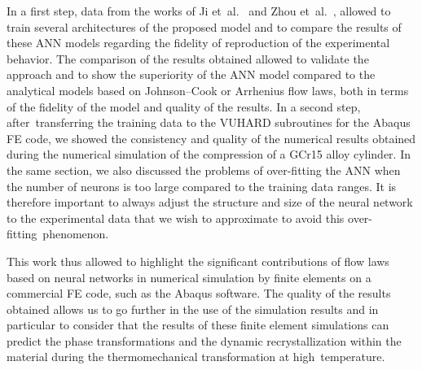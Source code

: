 \documentclass[algorithms,article,accept,pdftex,oneauthors]{Definitions/mdpi}
\begin{document}
In a first step, data from the works of Ji et~al.~\cite{Ji-2018} and Zhou et~al.~\cite{Zhou-2020}, allowed to train several architectures of the proposed model and to compare the results of these ANN models regarding the fidelity of reproduction of the experimental behavior.
The comparison of the results obtained allowed to validate the approach and to show the superiority of the ANN model compared to the analytical models based on Johnson--Cook or Arrhenius flow laws, both in terms of the fidelity of the model and quality of the results.
In a second step, after~transferring the training data to the VUHARD subroutines for the Abaqus FE code, we showed the consistency and quality of the numerical results obtained during the numerical simulation of the compression of a GCr15 alloy cylinder.
In the same section, we also discussed the problems of over-fitting the ANN when the number of neurons is too large compared to the training data ranges.
It is therefore important to always adjust the structure and size of the neural network to the experimental data that we wish to approximate to avoid this over-fitting~phenomenon.

This work thus allowed to highlight the significant contributions of flow laws based on neural networks in numerical simulation by finite elements on a commercial FE code, such as the Abaqus software.
The quality of the results obtained allows us to go further in the use of the simulation results and in particular to consider that the results of these finite element simulations can predict the phase transformations and the dynamic recrystallization within the material during the thermomechanical transformation at high~temperature.

\vspace{6pt}

\end{document}
